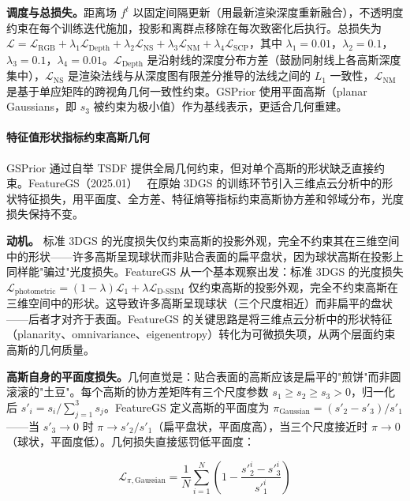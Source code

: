 \textbf{调度与总损失。}距离场 $f^t$ 以固定间隔更新（用最新渲染深度重新融合），不透明度约束在每个训练迭代施加，投影和离群点移除在每次致密化后执行。总损失为 $\mathcal{L} = \mathcal{L}_{\text{RGB}} + \lambda_1 \mathcal{L}_{\text{Depth}} + \lambda_2 \mathcal{L}_{\text{NS}} + \lambda_3 \mathcal{L}_{\text{NM}} + \lambda_4 \mathcal{L}_{\text{SCP}}$，其中 $\lambda_1 = 0.01$，$\lambda_2 = 0.1$，$\lambda_3 = 0.1$，$\lambda_4 = 0.01$。$\mathcal{L}_{\text{Depth}}$ 是沿射线的深度分布方差（鼓励同射线上各高斯深度集中），$\mathcal{L}_{\text{NS}}$ 是渲染法线与从深度图有限差分推导的法线之间的 $L_1$ 一致性，$\mathcal{L}_{\text{NM}}$ 是基于单应矩阵的跨视角几何一致性约束。GSPrior 使用平面高斯（planar Gaussians，即 $s_3$ 被约束为极小值）作为基线表示，更适合几何重建。

\paragraph{特征值形状指标约束高斯几何}

GSPrior 通过自举 TSDF 提供全局几何约束，但对单个高斯的形状缺乏直接约束。FeatureGS（2025.01）~\cite{2501_17655} 在原始 3DGS 的训练环节引入三维点云分析中的形状特征损失，用平面度、全方差、特征熵等指标约束高斯协方差和邻域分布，光度损失保持不变。

\textbf{动机。} 标准 3DGS 的光度损失仅约束高斯的投影外观，完全不约束其在三维空间中的形状——许多高斯呈现球状而非贴合表面的扁平盘状，因为球状高斯在投影上同样能"骗过"光度损失。FeatureGS 从一个基本观察出发：标准 3DGS 的光度损失 $\mathcal{L}_{\text{photometric}} = (1-\lambda)\mathcal{L}_1 + \lambda \mathcal{L}_{\text{D-SSIM}}$ 仅约束高斯的投影外观，完全不约束高斯在三维空间中的形状。这导致许多高斯呈现球状（三个尺度相近）而非扁平的盘状——后者才对齐于表面。FeatureGS 的关键思路是将三维点云分析中的形状特征（planarity、omnivariance、eigenentropy）转化为可微损失项，从两个层面约束高斯的几何质量。

\textbf{高斯自身的平面度损失。}几何直觉是：贴合表面的高斯应该是扁平的"煎饼"而非圆滚滚的"土豆"。每个高斯的协方差矩阵有三个尺度参数 $s_1 \geq s_2 \geq s_3 > 0$，归一化后 $s'_i = s_i / \sum_{j=1}^{3} s_j$。FeatureGS 定义高斯的平面度为 $\pi_{\text{Gaussian}} = (s'_2 - s'_3) / s'_1$——当 $s'_3 \to 0$ 时 $\pi \to s'_2/s'_1$（扁平盘状，平面度高），当三个尺度接近时 $\pi \to 0$（球状，平面度低）。几何损失直接惩罚低平面度：

\begin{equation}
    \mathcal{L}_{\pi,\text{Gaussian}} = \frac{1}{N}\sum_{i=1}^{N}\left(1 - \frac{s'^{i}_2 - s'^{i}_3}{s'^{i}_1}\right)
\end{equation}


